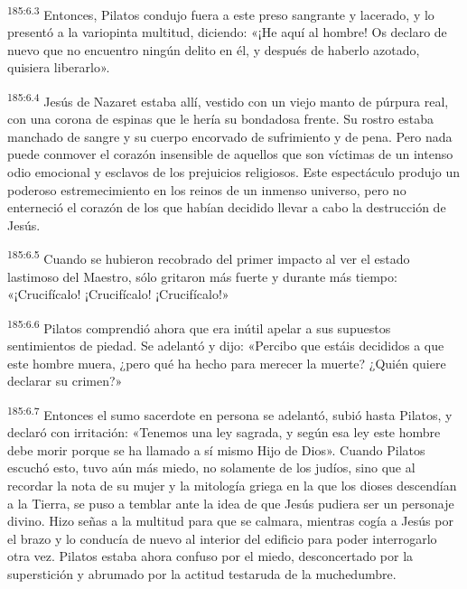 \par 
\textsuperscript{185:6.3} Entonces, Pilatos condujo fuera a este preso sangrante y lacerado, y lo presentó a la variopinta multitud, diciendo: «¡He aquí al hombre! Os declaro de nuevo que no encuentro ningún delito en él, y después de haberlo azotado, quisiera liberarlo».

\par 
\textsuperscript{185:6.4} Jesús de Nazaret estaba allí, vestido con un viejo manto de púrpura real, con una corona de espinas que le hería su bondadosa frente. Su rostro estaba manchado de sangre y su cuerpo encorvado de sufrimiento y de pena. Pero nada puede conmover el corazón insensible de aquellos que son víctimas de un intenso odio emocional y esclavos de los prejuicios religiosos. Este espectáculo produjo un poderoso estremecimiento en los reinos de un inmenso universo, pero no enterneció el corazón de los que habían decidido llevar a cabo la destrucción de Jesús.

\par 
\textsuperscript{185:6.5} Cuando se hubieron recobrado del primer impacto al ver el estado lastimoso del Maestro, sólo gritaron más fuerte y durante más tiempo: «¡Crucifícalo! ¡Crucifícalo! ¡Crucifícalo!»

\par 
\textsuperscript{185:6.6} Pilatos comprendió ahora que era inútil apelar a sus supuestos sentimientos de piedad. Se adelantó y dijo: «Percibo que estáis decididos a que este hombre muera, ¿pero qué ha hecho para merecer la muerte? ¿Quién quiere declarar su crimen?»

\par 
\textsuperscript{185:6.7} Entonces el sumo sacerdote en persona se adelantó, subió hasta Pilatos, y declaró con irritación: «Tenemos una ley sagrada, y según esa ley este hombre debe morir porque se ha llamado a sí mismo Hijo de Dios». Cuando Pilatos escuchó esto, tuvo aún más miedo, no solamente de los judíos, sino que al recordar la nota de su mujer y la mitología griega en la que los dioses descendían a la Tierra, se puso a temblar ante la idea de que Jesús pudiera ser un personaje divino. Hizo señas a la multitud para que se calmara, mientras cogía a Jesús por el brazo y lo conducía de nuevo al interior del edificio para poder interrogarlo otra vez. Pilatos estaba ahora confuso por el miedo, desconcertado por la superstición y abrumado por la actitud testaruda de la muchedumbre.

